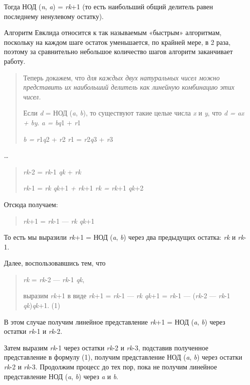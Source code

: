 \documentclass[12pt]{article}
\begin{document}
Тогда НОД (\emph{n}, \emph{a}) = \emph{rk}+1 (то есть наибольший общий
делитель равен последнему ненулевому остатку).

Алгоритм Евклида относится к так называемым «быстрым» алгоритмам,
поскольку на каждом шаге остаток уменьшается, по крайней мере, в 2 раза,
поэтому за сравнительно небольшое количество шагов алгоритм заканчивает
работу.

\begin{quote}
    Теперь докажем, что \emph{для каждых двух натуральных чисел можно
        представить их наибольший делитель как линейную комбинацию этих чисел.}

    Если \emph{d} = НОД (\emph{a}, \emph{b}), то существуют такие целые
    числа \emph{x} и \emph{y}, что \emph{d = ax + by}. \emph{a = bq}1 +
    \emph{r}1

    \emph{b = r}1\emph{q}2 + \emph{r}2 \emph{r}1 = \emph{r}2\emph{q}3 +
    \emph{r}3
\end{quote}

\ldots{}

\begin{quote}
    \emph{rk}-2 = \emph{rk}-1 \emph{qk} + \emph{rk}

    \emph{rk}-1 = \emph{rk qk}+1 \emph{+ rk}+1 \emph{rk = rk}+1 \emph{qk}+2
\end{quote}

Отсюда получаем:

\begin{quote}
    \emph{rk}+1 = \emph{rk}-1 --- \emph{rk qk}+1
\end{quote}

То есть мы выразили \emph{rk}+1 = НОД (\emph{a}, \emph{b}) через два
предыдущих остатка: \emph{rk} и \emph{rk}-1.

Далее, воспользовавшись тем, что

\begin{quote}
    \emph{rk} = \emph{rk}-2 --- \emph{rk}-1 \emph{qk},

    выразим \emph{rk}+1 в виде \emph{rk}+1 = \emph{rk}-1 --- \emph{rk qk}+1 =
    \emph{rk}-1 --- (\emph{rk}-2 --- \emph{rk}-1 \emph{qk})\emph{qk}+1. (1)
\end{quote}

В этом случае получим линейное представление \emph{rk}+1 = НОД
(\emph{a}, \emph{b}) через остатки \emph{rk}-1 и \emph{rk}-2.

Затем выразим \emph{rk}-1 через остатки \emph{rk}-2 и \emph{rk}-3,
подставив полученное представление в формулу (1), получим представление
НОД (\emph{a}, \emph{b}) через остатки \emph{rk}-2 и \emph{rk}-3.
Продолжим процесс до тех пор, пока не получим линейное представление НОД
(\emph{a}, \emph{b}) через \emph{a} и \emph{b}.
\end{document}
